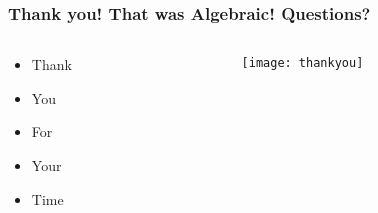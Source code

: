 \documentclass[aspectratio=169, 15pt,usenames,dvipsnames]{beamer}
\begin{document}
	\begin{gdblank}
		\frametitle{Thank you! That was Algebraic! Questions?}
		\begin{columns}
			\begin{column}{0.5\textwidth}
				\begin{itemize}
					\item Thank
					\item You 
					\item For
					\item Your
					\item Time
				\end{itemize}
			\end{column}
			\begin{column}{0.5\textwidth}				
				\texttt{[image: thankyou]}			
			\end{column}	
		\end{columns} 		
	\end{gdblank} 	
\end{document}
